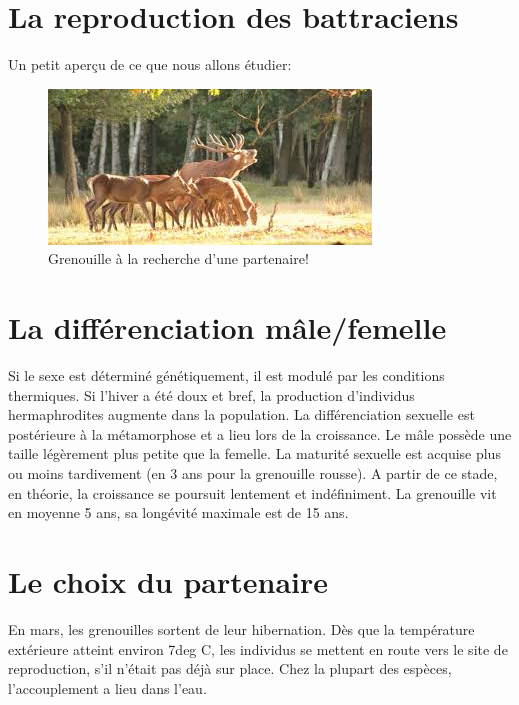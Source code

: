 \section{La reproduction des battraciens}

Un petit aperçu de ce que nous allons étudier:

\begin{figure}
	\begin{center}

	\includegraphics[width=.9\textwidth]{laRepro/CycleRepro.jpg}	
	\end{center}
	\caption{Grenouille à la recherche d'une partenaire!}%
	\label{fig:brameCerf}
\end{figure}

\section{La différenciation mâle/femelle}

Si le sexe est déterminé génétiquement, il est modulé par les conditions thermiques. Si l’hiver a été doux et bref, la production d’individus hermaphrodites augmente dans la population.
La différenciation sexuelle est postérieure à la métamorphose et a lieu lors de la croissance.
Le mâle possède une taille légèrement plus petite que la femelle.
La maturité sexuelle est acquise plus ou moins tardivement (en 3 ans pour la grenouille rousse). A partir de ce stade, en théorie, la croissance se poursuit lentement et indéfiniment. La grenouille vit en moyenne 5 ans, sa longévité maximale est de 15 ans.
        
\section{Le choix du partenaire}
En mars, les grenouilles sortent de leur hibernation.  Dès que la température extérieure atteint environ 7deg C, les individus se mettent en route vers le site de reproduction, s’il n’était pas déjà sur place. Chez la plupart des espèces, l’accouplement a lieu dans l’eau.


